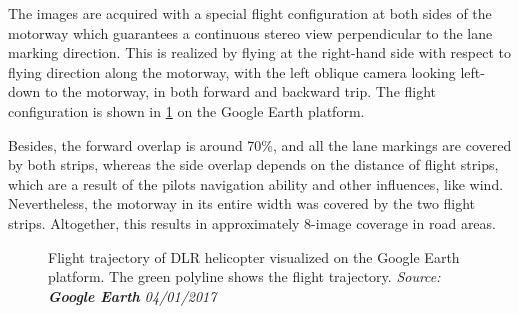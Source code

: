 \clearpage

The images are acquired with a special flight configuration at both sides of the motorway which guarantees a continuous stereo view perpendicular to the lane marking direction.%
This is realized by flying at the right-hand side with respect to flying direction along the motorway, with the left oblique camera looking left-down to the motorway, in both forward and backward trip. The flight configuration is shown in \cref{fig:FlightTrajectory} on the Google Earth platform.

Besides, the forward overlap is around 70\%, and all the lane markings are covered by both strips, whereas the side overlap depends on the distance of flight strips, which are a result of the pilots navigation ability and other influences, like wind. Nevertheless, the motorway in its entire width was covered by the two flight strips. Altogether, this results in approximately 8-image coverage in road areas. 

\begin{figure}%
  \centering
  \caption{Flight trajectory of DLR helicopter visualized on the Google Earth platform. The green polyline shows the flight trajectory. \textit{Source: \textbf{Google Earth} 04/01/2017}}
  \label{fig:FlightTrajectory}
\end{figure}


